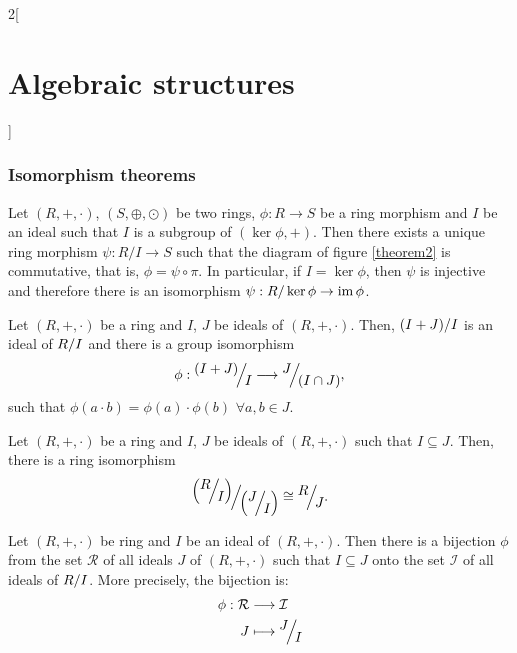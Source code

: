 \documentclass[../../../main.tex]{subfiles}
\begin{document}
\begin{multicols}{2}[\section{Algebraic structures}]
\subsubsection*{Isomorphism theorems}
\begin{theorem}
    Let $(R,+,\cdot)$, $(S,\oplus,\odot)$ be two rings, $\phi:R\rightarrow S$ be a ring morphism and $I$ be an ideal such that $I$ is a subgroup of $(\ker\phi,+)$. Then there exists a unique ring morphism $\psi:R/I\rightarrow S$ such that the diagram of figure \ref{theorem2} is commutative, that is, $\phi=\psi\circ\pi$.
    In particular, if $I=\ker\phi$, then $\psi$ is injective and therefore there is an isomorphism $\psi:R/\ker\phi\rightarrow\operatorname{im}\phi$.
\end{theorem}
\begin{theorem}
    Let $(R,+,\cdot)$ be a ring and $I$, $J$ be ideals of $(R,+,\cdot)$. Then, $\quot{(I+J)}{I}$ is an ideal of $\quot{R}{I}$ and there is a group isomorphism 
    $$\phi:\quot{(I+J)}{I}\longrightarrow\quot{J}{(I\cap J)},$$ such that $\phi(a\cdot b)=\phi(a)\cdot\phi(b)$ $\forall a,b\in J$.
\end{theorem}
\begin{theorem}
    Let $(R,+,\cdot)$ be a ring and $I$, $J$ be ideals of $(R,+,\cdot)$ such that $I\subseteq J$. Then, there is a ring isomorphism 
    $$\quot{\left(\quot{R}{I}\right)}{\left(\quot{J}{I}\right)}\cong\quot{R}{J}.$$
\end{theorem}
\begin{theorem}
    Let $(R,+,\cdot)$ be ring and $I$ be an ideal of $(R,+,\cdot)$. Then there is a bijection $\phi$ from the set $\mathcal{R}$ of all ideals $J$ of $(R,+,\cdot)$ such that $I\subseteq J$ onto the set $\mathcal{I}$ of all ideals of $\quot{R}{I}$. More precisely, the bijection is:
    \begin{align*}
        \phi:\mathcal{R}&\longrightarrow\mathcal{I}\\
        J&\longmapsto\quot{J}{I}
    \end{align*}
\end{theorem}

\end{multicols}
\end{document}
